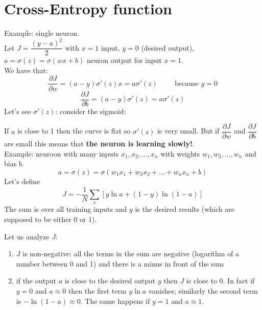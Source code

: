 \section{Cross-Entropy function}
Example: single neuron.\\
Let $J = \dfrac{(y-a)^2}{2}$ with $x=1$ input, $y=0$ (desired output), $a = \sigma(z) = \sigma(wx + b)$ neuron output for input $x=1$.\\

We have that:
\[
    \dfrac{\partial J}{\partial w} = (a-y)\sigma'(z)x = a\sigma'(z) \hspace{1cm} \text{because } y=0    
\]
\[
    \dfrac{\partial J}{\partial b} = (a-y)\sigma'(z) = a\sigma'(z) 
\]
Let's see $\sigma'(z)$: consider the sigmoid:\\
\begin{center}
\end{center}

If $a$ is close to 1 then the curve is flat so $\sigma'(z)$ is very small. But if $\dfrac{\partial J}{\partial w}$ and $\dfrac{\partial J}{\partial b} $ are small this means that \textbf{the neuron is learning slowly!}.\\

Example: neuroon with many inputs $x_1, x_2, \dots, x_n$ with weights $w_1, w_2, \dots, w_n$ and bias $b$.\\
\[
    a = \sigma(z) = \sigma(w_1x_1 + w_2x_2 + \dots + w_nx_n + b)    
\]
Let's define
\[
    J = -\dfrac{1}{N}\sum_x \left[y\ln a + (1-y)\ln(1-a)\right]   
\]
The sum is over all training inputs and $y$ is the desired results (which are supposed to be either 0 or 1).

Let us analyze $J$:
\begin{enumerate}[i]
    \item $J$ is non-negative: all the terms in the sum are negative (logarithm of a number between 0 and 1) and there is a minus in front of the sum
    \item if the output $a$ is close to the desired output $y$ then $J$ is close to 0. In fact if $y=0$ and $a\approx 0$ then the first term $y \ln a$ vanishes; similarly the second term is $-\ln (1-a) \approx 0$. The same happens if $y=1$ and $a\approx 1$.
\end{enumerate}

